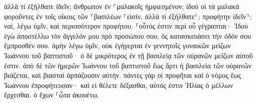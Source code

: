 \documentclass{openreader}
\begin{document}
ἀλλὰ τί ἐξήλθατε ἰδεῖν; ἄνθρωπον ἐν ⸀μαλακοῖς ἠμφιεσμένον; ἰδοὺ οἱ τὰ μαλακὰ φοροῦντες ἐν τοῖς οἴκοις τῶν ⸀βασιλέων ⸀εἰσίν. 
ἀλλὰ τί ἐξήλθατε⸂; προφήτην ἰδεῖν⸃; ναί, λέγω ὑμῖν, καὶ περισσότερον προφήτου. 
⸀οὗτός ἐστιν περὶ οὗ γέγραπται· Ἰδοὺ ἐγὼ ἀποστέλλω τὸν ἄγγελόν μου πρὸ προσώπου σου, ὃς κατασκευάσει τὴν ὁδόν σου ἔμπροσθέν σου. 
ἀμὴν λέγω ὑμῖν, οὐκ ἐγήγερται ἐν γεννητοῖς γυναικῶν μείζων Ἰωάννου τοῦ βαπτιστοῦ· ὁ δὲ μικρότερος ἐν τῇ βασιλείᾳ τῶν οὐρανῶν μείζων αὐτοῦ ἐστιν. 
ἀπὸ δὲ τῶν ἡμερῶν Ἰωάννου τοῦ βαπτιστοῦ ἕως ἄρτι ἡ βασιλεία τῶν οὐρανῶν βιάζεται, καὶ βιασταὶ ἁρπάζουσιν αὐτήν. 
πάντες γὰρ οἱ προφῆται καὶ ὁ νόμος ἕως Ἰωάννου ἐπροφήτευσαν· 
καὶ εἰ θέλετε δέξασθαι, αὐτός ἐστιν Ἠλίας ὁ μέλλων ἔρχεσθαι. 
ὁ ἔχων ⸀ὦτα ἀκουέτω. 
\end{document}
